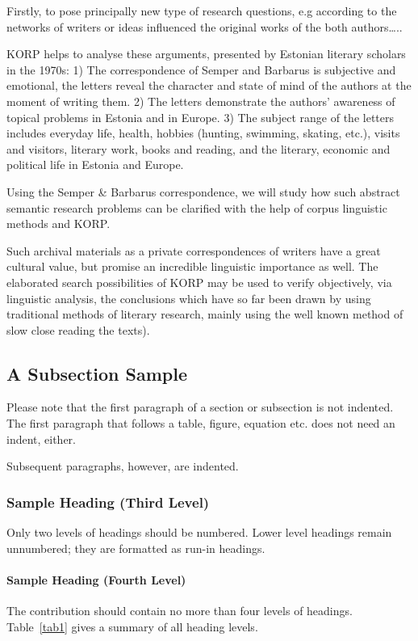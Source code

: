 \documentclass[runningheads]{llncs}
\begin{document}
Firstly, to pose principally new type of research  questions, e.g according to the networks of  writers or ideas influenced  the original works of the both authors…..


KORP helps to analyse these arguments, presented by Estonian literary scholars in the 1970s:
1) The correspondence of Semper and Barbarus is subjective and emotional, the letters reveal the character and state of mind of the authors at the moment of writing them.
2) The letters demonstrate the authors’ awareness of topical problems in Estonia and in Europe.
3) The subject range of the letters includes everyday life, health, hobbies (hunting, swimming, skating, etc.), visits and visitors, literary work, books and reading, and the literary, economic and political life in Estonia and Europe.


Using the Semper \& Barbarus correspondence, we will study how such abstract semantic research problems can be clarified with the help of corpus linguistic methods and KORP.

Such archival materials as a private correspondences of writers have a great cultural value, but promise an incredible linguistic importance as well. The elaborated search possibilities of KORP may be used to verify objectively, via linguistic analysis, the conclusions which have so far been drawn by using traditional methods of literary research, mainly using the well known method of slow close reading the texts). 



\subsection{A Subsection Sample}
Please note that the first paragraph of a section or subsection is
not indented. The first paragraph that follows a table, figure,
equation etc. does not need an indent, either.

Subsequent paragraphs, however, are indented.

\subsubsection{Sample Heading (Third Level)} Only two levels of
headings should be numbered. Lower level headings remain unnumbered;
they are formatted as run-in headings.

\paragraph{Sample Heading (Fourth Level)}
The contribution should contain no more than four levels of
headings. Table~\ref{tab1} gives a summary of all heading levels.
\end{document}
